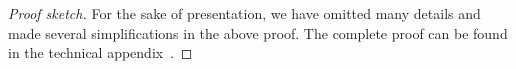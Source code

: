 \documentclass[format=acmsmall, review=true, screen=true]{acmart}
\renewcommand{\sectionname}{Section}
\newenvironment{toplas}{}{}
\newcommand{\itoplassug}[1]{}
\begin{document}
\begin{toplas}
\begin{proof}[Proof sketch]
  For the sake of presentation, we have omitted many details and made several simplifications in the above proof.
  The complete proof can be found in the technical appendix~\citep{technical_appendix}.
  \end{proof}
\end{toplas}

\end{document}
